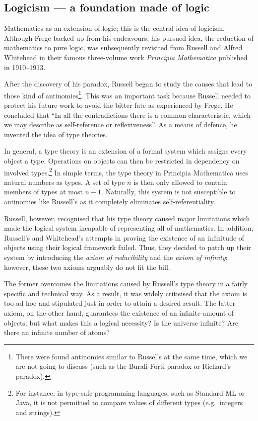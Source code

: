 \documentclass[hidelinks]{article}
\theoremstyle{plain}
\theoremstyle{definition}
\theoremstyle{rem}
\begin{document}
\subsection{Logicism --- a foundation made of logic}\label{ssec_logicism}
Mathematics as an extension of logic; this is the central idea of logicism. Although Frege backed up from his endeavours, his pursued idea, the reduction of mathematics to pure logic, was subsequently revisited from Russell and Alfred Whitehead in their famous three-volume work \textit{Principia Mathematica} published in 1910--1913.

After the discovery of his paradox, Russell began to study the causes that lead to those kind of antinomies\footnote{There were found antinomies similar to Russel's at the same time, which we are not going to discuss (such as the Burali-Forti paradox or Richard's paradox).\cite{russell_self_referentiality}}. This was an important task because Russell needed to protect his future work to avoid the bitter fate as experienced by Frege. He concluded that ``In all the contradictions there is a common characteristic, which we may describe as self-reference or reflexiveness''\cite[p. 224]{russell_self_referentiality}. As a means of defence, he invented the idea of type theories. 

In general, a type theory is an extension of a formal system which assigns every object a type. Operations on objects can then be restricted in dependency on involved types.\footnote{For instance, in type-safe programming languages, such as Standard ML or Java, it is not permitted to compare values of different types (e.g.\ integers and strings).} In simple terms, the type theory in Principia Mathematica uses natural numbers as types. A set of type $n$ is then only allowed to contain members of types at most $n-1$. Naturally, this system is not susceptible to antinomies like Russell's as it completely eliminates self-referentiality. 

Russell, however, recognised that his type theory caused major limitations which made the logical system incapable of representing all of mathematics. In addition, Russell's and Whitehead's attempts in proving the existence of an infinitude of objects using their logical framework failed. Thus, they decided to patch up their system by introducing the \textit{axiom of reducibility} and the \textit{axiom of infinity}; however, these two axioms arguably do not fit the bill.

The former overcomes the limitations caused by Russell's type theory in a fairly specific and technical way. As a result, it was widely critisised that the axiom is too ad hoc and stipulated just in order to attain a desired result.
The latter axiom, on the other hand, guarantees the existence of an infinite amount of objects; but what makes this a logical necessity? Is the universe infinite? Are there an infinite number of atoms?
\end{document}
